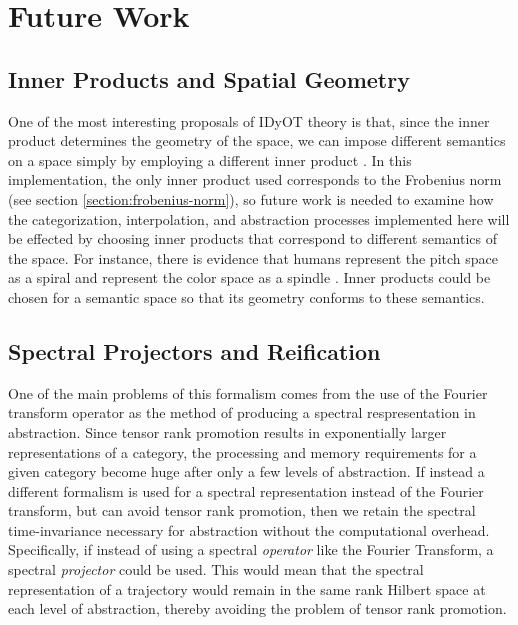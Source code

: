 \section{Future Work}
\label{section:future-work}

\subsection{Inner Products and Spatial Geometry}
\label{section:inner-products-spatial-geometry}

One of the most interesting proposals of IDyOT theory is that, since the inner product determines the geometry of the space, we can impose different semantics on a space simply by employing a different inner product \citep{wiggins2018creativity}. In this implementation, the only inner product used corresponds to the Frobenius norm (see section \ref{section:frobenius-norm}), so future work is needed to examine how the categorization, interpolation, and abstraction processes implemented here will be effected by choosing inner products that correspond to different semantics of the space.  For instance, there is evidence that humans represent the pitch space as a spiral \citep{deutsch2013psychology} and represent the color space as a spindle \citep{sivik1994color}.  Inner products could be chosen for a semantic space so that its geometry conforms to these semantics.

\subsection{Spectral Projectors and Reification}
\label{section:spectral-projectors-reification}

One of the main problems of this formalism comes from the use of the Fourier transform operator as the method of producing a spectral respresentation in abstraction.  Since tensor rank promotion results in exponentially larger representations of a category, the processing and memory requirements for a given category become huge after only a few levels of abstraction.  If instead a different formalism is used for a spectral representation instead of the Fourier transform, but can avoid tensor rank promotion, then we retain the spectral time-invariance necessary for abstraction without the computational overhead. Specifically, if instead of using a spectral \textit{operator} like the Fourier Transform, a spectral \textit{projector} could be used.  This would mean that the spectral representation of a trajectory would remain in the same rank Hilbert space at each level of abstraction, thereby avoiding the problem of tensor rank promotion.

